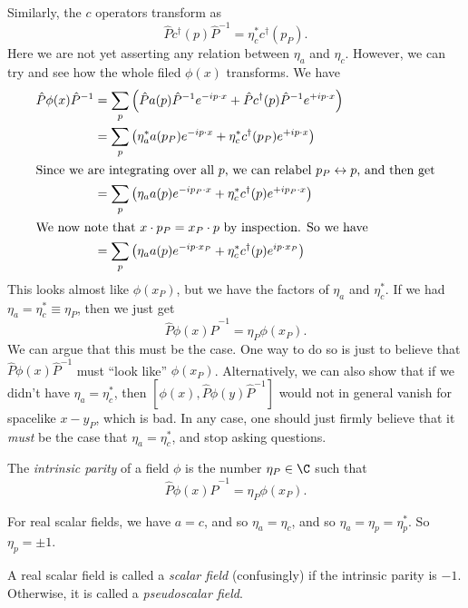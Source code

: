 \documentclass[a4paper]{article}
\begin{document}
Similarly, the $c$ operators transform as
\[
  \hat{P} c^\dagger(p) \hat{P}^{-1} = \eta_c^* c^\dagger(p_P).
\]
Here we are not yet asserting any relation between $\eta_a$ and $\eta_c$. However, we can try and see how the whole filed $\phi(x)$ transforms. We have
\begin{align*}
  \hat{P} \phi(x) \hat{P}^{-1} &= \sum_p \left(\hat{P}a(p)\hat{P}^{-1} e^{-ip\cdot x} + \hat{P}c^\dagger (p)\hat{P}^{-1} e^{+ip\cdot x}\right)\\
  &= \sum_p \left(\eta_a^* a(p_P) e^{-ip\cdot x} + \eta_c^* c^\dagger (p_P) e^{+ip\cdot x}\right)\\
  \intertext{Since we are integrating over all $p$, we can relabel $p_P \leftrightarrow p$, and then get}
  &= \sum_p \left(\eta_a a(p) e^{-i p_P \cdot x} + \eta_c^* c^\dagger(p) e^{+ip_P \cdot x}\right)\\
  \intertext{We now note that $x \cdot p_P = x_P \cdot p$ by inspection. So we have}
  &= \sum_p\left(\eta_a a(p) e^{-ip\cdot x_P} + \eta_c^* c^\dagger(p) e^{ip\cdot x_P}\right)
\end{align*}
This looks almost like $\phi(x_P)$, but we have the factors of $\eta_a$ and $\eta_c^*$. If we had $\eta_a = \eta_c^* \equiv \eta_P$, then we just get
\[
  \hat{P} \phi(x) \hat{P}^{-1} = \eta_P \phi(x_P).
\]
We can argue that this must be the case. One way to do so is just to believe that $\hat{P} \phi(x)\hat{P}^{-1}$ must ``look like'' $\phi(x_P)$. Alternatively, we can also show that if we didn't have $\eta_a = \eta_c^*$, then $[\phi(x), \hat{P} \phi(y) \hat{P}^{-1}]$ would not in general vanish for spacelike $x - y_P$, which is bad. In any case, one should just firmly believe that it \emph{must} be the case that $\eta_a = \eta_c^*$, and stop asking questions.

\begin{defi}
  The \emph{intrinsic parity} of a field $\phi$ is the number $\eta_P \in \C$ such that
  \[
    \hat{P} \phi(x) \hat{P}^{-1} = \eta_P \phi(x_P).
  \]
\end{defi}

For real scalar fields, we have $a = c$, and so $\eta_a = \eta_c$, and so $\eta_a = \eta_p = \eta_p^*$. So $\eta_p = \pm 1$.
\begin{defi}
  A real scalar field is called a \emph{scalar field} (confusingly) if the intrinsic parity is $-1$. Otherwise, it is called a \emph{pseudoscalar field}.
\end{defi}
\end{document}
